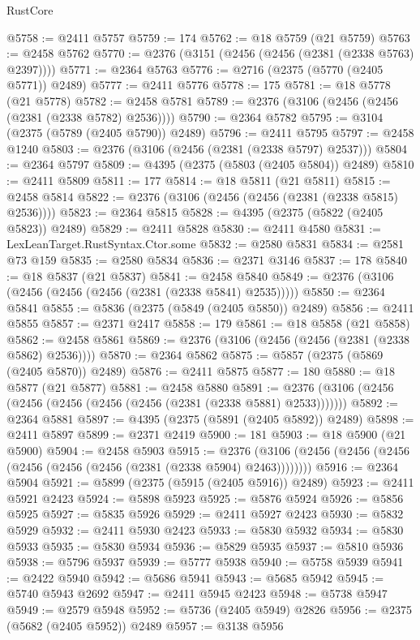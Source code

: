 \begin{lexlean}{RustCore}
\begin{coremodule}
@5758 := @2411 @5757
@5759 := 174
@5762 := @18 @5759 (@21 @5759)
@5763 := @2458 @5762
@5770 := @2376 (@3151 (@2456 (@2456 (@2381 (@2338 @5763) @2397))))
@5771 := @2364 @5763
@5776 := @2716 (@2375 (@5770 (@2405 @5771)) @2489)
@5777 := @2411 @5776
@5778 := 175
@5781 := @18 @5778 (@21 @5778)
@5782 := @2458 @5781
@5789 := @2376 (@3106 (@2456 (@2456 (@2381 (@2338 @5782) @2536))))
@5790 := @2364 @5782
@5795 := @3104 (@2375 (@5789 (@2405 @5790)) @2489)
@5796 := @2411 @5795
@5797 := @2458 @1240
@5803 := @2376 (@3106 (@2456 (@2381 (@2338 @5797) @2537)))
@5804 := @2364 @5797
@5809 := @4395 (@2375 (@5803 (@2405 @5804)) @2489)
@5810 := @2411 @5809
@5811 := 177
@5814 := @18 @5811 (@21 @5811)
@5815 := @2458 @5814
@5822 := @2376 (@3106 (@2456 (@2456 (@2381 (@2338 @5815) @2536))))
@5823 := @2364 @5815
@5828 := @4395 (@2375 (@5822 (@2405 @5823)) @2489)
@5829 := @2411 @5828
@5830 := @2411 @4580
@5831 := LexLeanTarget.RustSyntax.Ctor.some
@5832 := @2580 @5831
@5834 := @2581 @73 @159
@5835 := @2580 @5834
@5836 := @2371 @3146
@5837 := 178
@5840 := @18 @5837 (@21 @5837)
@5841 := @2458 @5840
@5849 := @2376 (@3106 (@2456 (@2456 (@2456 (@2381 (@2338 @5841) @2535)))))
@5850 := @2364 @5841
@5855 := @5836 (@2375 (@5849 (@2405 @5850)) @2489)
@5856 := @2411 @5855
@5857 := @2371 @2417
@5858 := 179
@5861 := @18 @5858 (@21 @5858)
@5862 := @2458 @5861
@5869 := @2376 (@3106 (@2456 (@2456 (@2381 (@2338 @5862) @2536))))
@5870 := @2364 @5862
@5875 := @5857 (@2375 (@5869 (@2405 @5870)) @2489)
@5876 := @2411 @5875
@5877 := 180
@5880 := @18 @5877 (@21 @5877)
@5881 := @2458 @5880
@5891 := @2376 (@3106 (@2456 (@2456 (@2456 (@2456 (@2456 (@2381 (@2338 @5881) @2533)))))))
@5892 := @2364 @5881
@5897 := @4395 (@2375 (@5891 (@2405 @5892)) @2489)
@5898 := @2411 @5897
@5899 := @2371 @2419
@5900 := 181
@5903 := @18 @5900 (@21 @5900)
@5904 := @2458 @5903
@5915 := @2376 (@3106 (@2456 (@2456 (@2456 (@2456 (@2456 (@2456 (@2381 (@2338 @5904) @2463))))))))
@5916 := @2364 @5904
@5921 := @5899 (@2375 (@5915 (@2405 @5916)) @2489)
@5923 := @2411 @5921 @2423
@5924 := @5898 @5923
@5925 := @5876 @5924
@5926 := @5856 @5925
@5927 := @5835 @5926
@5929 := @2411 @5927 @2423
@5930 := @5832 @5929
@5932 := @2411 @5930 @2423
@5933 := @5830 @5932
@5934 := @5830 @5933
@5935 := @5830 @5934
@5936 := @5829 @5935
@5937 := @5810 @5936
@5938 := @5796 @5937
@5939 := @5777 @5938
@5940 := @5758 @5939
@5941 := @2422 @5940
@5942 := @5686 @5941
@5943 := @5685 @5942
@5945 := @5740 @5943 @2692
@5947 := @2411 @5945 @2423
@5948 := @5738 @5947
@5949 := @2579 @5948
@5952 := @5736 (@2405 @5949) @2826
@5956 := @2375 (@5682 (@2405 @5952)) @2489
@5957 := @3138 @5956

\end{coremodule}
\end{lexlean}
